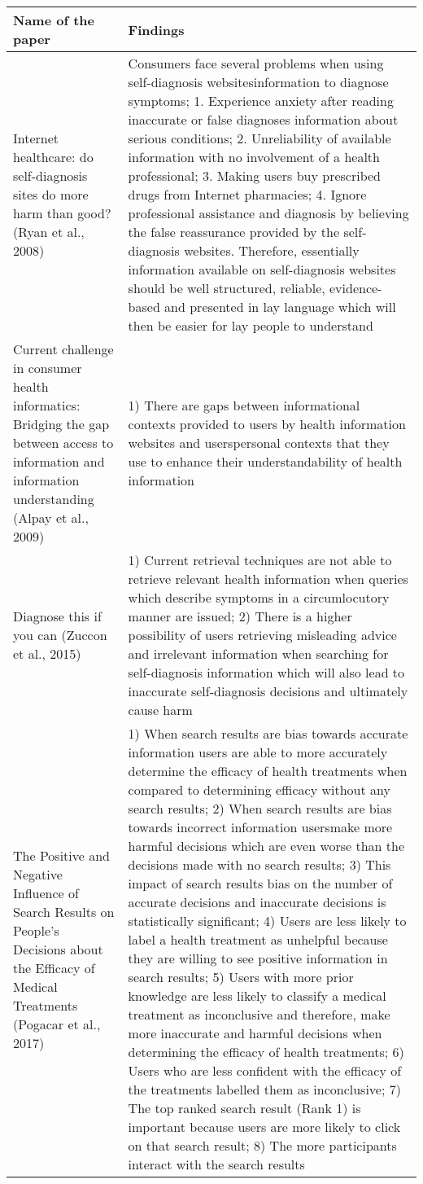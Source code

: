 \documentclass[]{article}
\begin{document}
\begin{center}
	\begin{longtable}{||p{4cm} | p{10cm}||} 
		\hline
		\textbf{Name of the paper} & \textbf{Findings}\\ [0.5ex] 
		\hline\hline
		 Internet healthcare: do self-diagnosis sites do more harm than good? (Ryan et al., 2008) & Consumers face several problems when using self-diagnosis websites\textquotesingle information to diagnose symptoms; 1. Experience anxiety after reading inaccurate or false diagnoses information about serious conditions; 2. Unreliability of available information with no involvement of a health professional; 3. Making users buy prescribed drugs from Internet pharmacies; 4. Ignore professional assistance and diagnosis by believing the false reassurance provided by the self-diagnosis websites. Therefore, essentially information available on self-diagnosis websites should be well structured, reliable, evidence-based and presented in lay language which will then be easier for lay people to understand \\ \hline Current challenge in consumer health informatics: Bridging the gap between access to information and information understanding (Alpay et al., 2009) & 1) There are gaps between informational contexts provided to users by health information websites and users\textquotesingle personal contexts that they use to enhance their understandability of health information \\ \hline Diagnose this if you can (Zuccon et al., 2015) & 1) Current retrieval techniques are not able to retrieve relevant health information when queries which describe symptoms in a circumlocutory manner are issued; 2) There is a higher possibility of users retrieving misleading advice and irrelevant information when searching for self-diagnosis information which will also lead to inaccurate self-diagnosis decisions and ultimately cause harm \\ \hline The Positive and Negative Influence of Search Results on People's Decisions about the Efficacy of Medical Treatments (Pogacar et al., 2017) & 1) When search results are bias towards accurate information users are able to more accurately determine the efficacy of health treatments when compared to determining efficacy without any search results; 2) When search results are bias towards incorrect information users\textquotesingle make more harmful decisions which are even worse than the decisions made with no search results; 3) This impact of search results bias on the number of accurate decisions and inaccurate decisions is statistically significant; 4) Users are less likely to label a health treatment as unhelpful because they are willing to see positive information in search results;  5) Users with more prior knowledge are less likely to classify a medical treatment as inconclusive and therefore, make more inaccurate and harmful decisions when determining the efficacy of health treatments; 6) Users who are less confident with the efficacy of the treatments labelled them as inconclusive; 7) The top ranked search result (Rank 1) is important because users are more likely to click on that search result; 8) The more participants interact with the search results 
\end{longtable}
\end{center}
\end{document}
